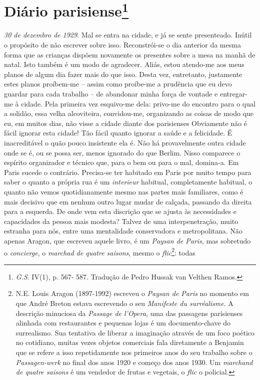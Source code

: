 \chapter{Diário parisiense\footnote[*]{\emph{G.S}. IV(1), p.
  567- 587. Tradução de Pedro Hussak van Velthen Ramos.}}

\emph{30 de dezembro de 1929}. Mal se entra na cidade, e já se sente
presenteado. Inútil o propósito de não escrever sobre isso.
Reconstrói-se o dia anterior da mesma forma que as crianças dispõem
novamente os presentes sobre a mesa na manhã de natal. Isto também é um
modo de agradecer. Aliás, estou atendo-me aos meus planos de algum dia
fazer mais do que isso. Desta vez, entretanto, justamente estes planos
proíbem-me -- assim como proíbe-me a prudência que eu devo guardar para
cada trabalho -- de abandonar minha força de vontade e entregar-me à
cidade. Pela primeira vez esquivo-me dela: privo-me do encontro para o
qual a solidão, essa velha alcoviteira, convidou-me, organizando as
coisas de modo que eu, em muitos dias, não visse a cidade diante dos
parisienses Obviamente não é fácil ignorar esta cidade! Tão fácil quanto
ignorar a saúde e a felicidade. É inacreditável o quão pouco insistente
ela é. Não há provavelmente outra cidade onde se é, ou se possa ser,
menos ignorado do que Berlim. Nisso comparece o espírito organizador e
técnico que, para o bem ou para o mal, domina-a. Em Paris sucede o
contrário. Precisa-se ter habitado em Paris por muito tempo para saber o
quanto a própria rua é um \emph{interieur} habitual, completamente
habitual, o quanto não vemos quotidianamente mesmo nas partes mais
familiares, como é mais decisivo que em nenhum outro lugar mudar de
calçada, passando da direita para a esquerda. De onde vem esta discrição
que se ajusta às necessidades e capacidades da pessoa mais modesta?
Talvez de uma interpenetração, muito estranha para nós, entre uma
mentalidade conservadora e metropolitana. Não apenas Aragon, que
escreveu aquele livro, é um \emph{Paysan de Paris}, mas sobretudo o
\emph{concierge}, o \emph{marchad de quatre saisons}, mesmo o
\emph{flic}\footnote{N.E. Louis Aragon (1897-1992) escreveu o
  \emph{Paysan de Paris} no momento em que André Breton estava
  escrevendo o seu \emph{Manifeste du surréalisme}. A descrição
  minuciosa da \emph{Passage de l'Opera}, uma das passagens parisienses
  alinhada com restaurantes e pequenas lojas é um documento-chave do
  surrealismo. Sua tentativa de liberar a imaginação através de um foco
  poético no cotidiano, muitas vezes objetos comerciais fala diretamente
  a Benjamin que se refere a isso repetidamente nos primeiros anos do
  seu trabalho sobre o \emph{Passagen-werk} no final dos anos 1920 e
  começo dos anos 1930. Um \emph{marchand de quatre saisons} é um
  vendedor de frutas e vegetais, o \emph{flic} o policial.}: todas
